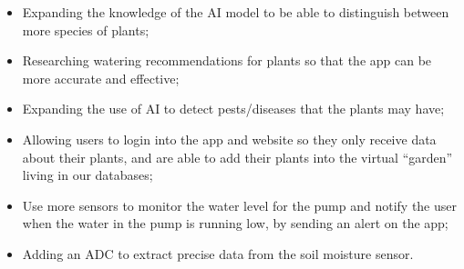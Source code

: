 \documentclass[12pt]{article}
\begin{document}
\begin{itemize}[leftmargin=2cm]
\item Expanding the knowledge of the AI model to be able to distinguish between more species of plants;
\item Researching watering recommendations for plants so that the app can be more accurate and effective;
\item Expanding the use of AI to detect pests/diseases that the plants may have;
\item Allowing users to login into the app and website so they only receive data about their plants, and are able to add their plants into the virtual “garden” living in our databases;
\item Use more sensors to monitor the water level for the pump and notify the user when the water in the pump is running low, by sending an alert on the app;
\item Adding an ADC to extract precise data from the soil moisture sensor.
\end{itemize}

\nocite{*} %



\end{document}
